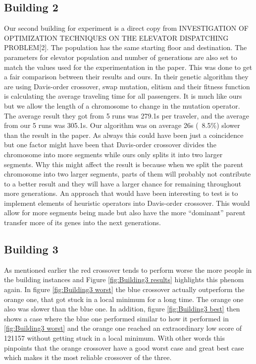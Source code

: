 \newpage

\subsection{Building 2}
Our second building for experiment is a direct copy from INVESTIGATION OF OPTIMIZATION TECHNIQUES ON THE ELEVATOR DISPATCHING PROBLEM[2]. The population has the same starting floor and destination. The parameters for elevator population and number of generations are also set to match the values used for the experimentation in the paper. This was done to get a fair comparison between their results and ours. In their genetic algorithm they are using Davis-order crossover, swap mutation, elitism and their fitness function is calculating the average traveling time for all passengers. It is much like ours but we allow the length of a chromosome to change in the mutation operator. The average result they got from 5 runs was 279.1s per traveler, and the average from our 5 runs was 305.1s. Our algorithm was on average 26s (~8.5\%) slower than the result in the paper. As always this could have been just a coincidence but one factor might have been that Davis-order crossover divides the chromosome into more segments while ours only splits it into two larger segments. Why this might affect the result is because when we split the parent chromosome into two larger segments, parts of them will probably not contribute to a better result and they will have a larger chance for remaining throughout more generations. An approach that would have been interesting to test is to implement elements of heuristic operators into Davis-order crossover. This would allow for more segments being made but also have the more “dominant” parent transfer more of its genes into the next generations.

\newpage

\subsection{Building 3}
As mentioned earlier the red crossover tends to perform worse the more people in the building instances and Figure \ref{fig:Building3 results} highlights this phenom again. In figure \ref{fig:Building3 worst} the blue crossover actually outperform the orange one, that got stuck in a local minimum for a long time. The orange one also was slower than the blue one. In addition, figure \ref{fig:Building3 best} then shows a case where the blue one performed similar to how it performed in \ref{fig:Building3 worst} and the orange one reached an extraordinary low score of 121157 without getting stuck in a local minimum. With other words this pinpoints that the orange crossover have a good worst case and great best case which makes it the most reliable crossover of the three.

